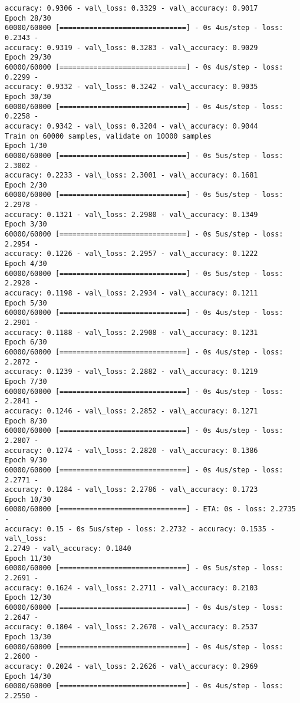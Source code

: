\documentclass[11pt]{article}
\begin{document}
\begin{Verbatim}[commandchars=\\\{\}]
accuracy: 0.9306 - val\_loss: 0.3329 - val\_accuracy: 0.9017
Epoch 28/30
60000/60000 [==============================] - 0s 4us/step - loss: 0.2343 -
accuracy: 0.9319 - val\_loss: 0.3283 - val\_accuracy: 0.9029
Epoch 29/30
60000/60000 [==============================] - 0s 4us/step - loss: 0.2299 -
accuracy: 0.9332 - val\_loss: 0.3242 - val\_accuracy: 0.9035
Epoch 30/30
60000/60000 [==============================] - 0s 4us/step - loss: 0.2258 -
accuracy: 0.9342 - val\_loss: 0.3204 - val\_accuracy: 0.9044
Train on 60000 samples, validate on 10000 samples
Epoch 1/30
60000/60000 [==============================] - 0s 5us/step - loss: 2.3002 -
accuracy: 0.2233 - val\_loss: 2.3001 - val\_accuracy: 0.1681
Epoch 2/30
60000/60000 [==============================] - 0s 5us/step - loss: 2.2978 -
accuracy: 0.1321 - val\_loss: 2.2980 - val\_accuracy: 0.1349
Epoch 3/30
60000/60000 [==============================] - 0s 5us/step - loss: 2.2954 -
accuracy: 0.1226 - val\_loss: 2.2957 - val\_accuracy: 0.1222
Epoch 4/30
60000/60000 [==============================] - 0s 5us/step - loss: 2.2928 -
accuracy: 0.1198 - val\_loss: 2.2934 - val\_accuracy: 0.1211
Epoch 5/30
60000/60000 [==============================] - 0s 4us/step - loss: 2.2901 -
accuracy: 0.1188 - val\_loss: 2.2908 - val\_accuracy: 0.1231
Epoch 6/30
60000/60000 [==============================] - 0s 4us/step - loss: 2.2872 -
accuracy: 0.1239 - val\_loss: 2.2882 - val\_accuracy: 0.1219
Epoch 7/30
60000/60000 [==============================] - 0s 4us/step - loss: 2.2841 -
accuracy: 0.1246 - val\_loss: 2.2852 - val\_accuracy: 0.1271
Epoch 8/30
60000/60000 [==============================] - 0s 4us/step - loss: 2.2807 -
accuracy: 0.1274 - val\_loss: 2.2820 - val\_accuracy: 0.1386
Epoch 9/30
60000/60000 [==============================] - 0s 4us/step - loss: 2.2771 -
accuracy: 0.1284 - val\_loss: 2.2786 - val\_accuracy: 0.1723
Epoch 10/30
60000/60000 [==============================] - ETA: 0s - loss: 2.2735 -
accuracy: 0.15 - 0s 5us/step - loss: 2.2732 - accuracy: 0.1535 - val\_loss:
2.2749 - val\_accuracy: 0.1840
Epoch 11/30
60000/60000 [==============================] - 0s 5us/step - loss: 2.2691 -
accuracy: 0.1624 - val\_loss: 2.2711 - val\_accuracy: 0.2103
Epoch 12/30
60000/60000 [==============================] - 0s 4us/step - loss: 2.2647 -
accuracy: 0.1804 - val\_loss: 2.2670 - val\_accuracy: 0.2537
Epoch 13/30
60000/60000 [==============================] - 0s 4us/step - loss: 2.2600 -
accuracy: 0.2024 - val\_loss: 2.2626 - val\_accuracy: 0.2969
Epoch 14/30
60000/60000 [==============================] - 0s 4us/step - loss: 2.2550 -

\end{Verbatim}
\end{document}
